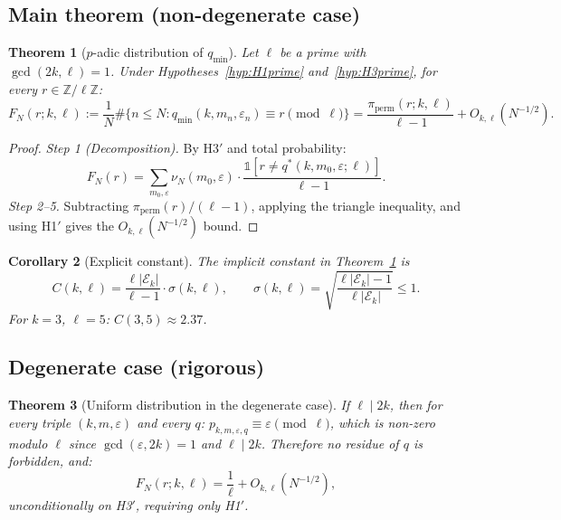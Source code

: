 \documentclass[11pt,a4paper]{article}
\theoremstyle{plain}
\newtheorem{theorem}{Theorem}[section]
\newtheorem{corollary}[theorem]{Corollary}
\theoremstyle{definition}
\newcommand{\qmin}{q_{\min}}
\newcommand{\Z}{\mathbb{Z}}
\newcommand{\PiP}{\pi_{\mathrm{perm}}}
\newcommand{\eps}{\varepsilon}
\newcommand{\Eclass}{\mathcal{E}}
\begin{document}
\subsection{Main theorem (non-degenerate case)}

\begin{heuristicbox}
\begin{theorem}[$p$-adic distribution of $\qmin$]\label{thm:main}
Let $\ell$ be a prime with $\gcd(2k, \ell) = 1$. Under
Hypotheses~\ref{hyp:H1prime} and~\ref{hyp:H3prime}, for every $r \in \Z/\ell\Z$:
\begin{equation}
F_N(r; k, \ell) := \frac{1}{N} \#\{n \le N : \qmin(k, m_n, \eps_n) \equiv r \pmod \ell\}
= \frac{\PiP(r; k, \ell)}{\ell - 1} + O_{k, \ell}(N^{-1/2}).
\label{eq:main}
\end{equation}
\end{theorem}
\end{heuristicbox}

\begin{proof}
\emph{Step 1 (Decomposition).} By H3$'$ and total probability:
\[
F_N(r) = \sum_{m_0, \eps} \nu_N(m_0, \eps) \cdot
\frac{\mathbb{1}[r \neq q^*(k, m_0, \eps; \ell)]}{\ell - 1}.
\]
\emph{Step 2--5.} Subtracting $\PiP(r)/(\ell-1)$, applying the triangle
inequality, and using H1$'$ gives the $O_{k,\ell}(N^{-1/2})$ bound.
\end{proof}

\begin{corollary}[Explicit constant]\label{cor:constant}
The implicit constant in Theorem~\ref{thm:main} is
\[
C(k, \ell) = \frac{\ell |\Eclass_k|}{\ell - 1} \cdot \sigma(k, \ell), \qquad
\sigma(k, \ell) = \sqrt{\frac{\ell |\Eclass_k| - 1}{\ell |\Eclass_k|}} \le 1.
\]
For $k = 3$, $\ell = 5$: $C(3, 5) \approx 2.37$.
\end{corollary}

\subsection{Degenerate case (rigorous)}

\begin{rigorousbox}
\begin{theorem}[Uniform distribution in the degenerate case]\label{thm:degenerate}
If $\ell \mid 2k$, then for every triple $(k, m, \eps)$ and every $q$:
$p_{k, m, \eps, q} \equiv \eps \pmod \ell$, which is non-zero modulo $\ell$ since
$\gcd(\eps, 2k) = 1$ and $\ell \mid 2k$. Therefore no residue of $q$ is forbidden,
and:
\[
F_N(r; k, \ell) = \frac{1}{\ell} + O_{k, \ell}(N^{-1/2}),
\]
\emph{unconditionally on H3$'$, requiring only H1$'$.}
\end{theorem}
\end{rigorousbox}
\end{document}
